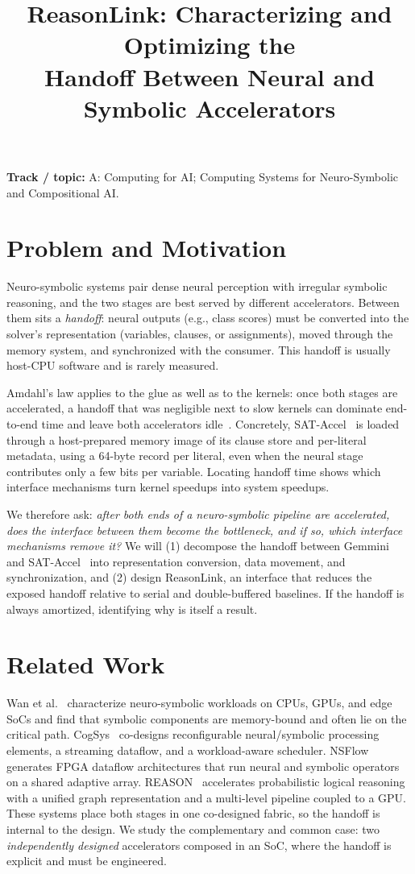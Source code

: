 \documentclass[conference,10pt,letterpaper]{IEEEtran}
\title{ReasonLink: Characterizing and Optimizing the\\Handoff Between Neural and Symbolic Accelerators}
\author{\IEEEauthorblockN{Vayun Gupta (vg2684), Aaron Mano Cherian (amc2535)}
\IEEEauthorblockA{COMS 6998: AI-Native Computing $\mid$ Fall 2026\\
Project Proposal $\mid$ Due October 5, 2026, 11:59 PM ET}}
\begin{document}
\maketitle
\thispagestyle{plain}
\pagestyle{plain}
\noindent\textbf{Track / topic:} A: Computing for AI; Computing Systems for Neuro-Symbolic and Compositional AI.

\section{Problem and Motivation}
Neuro-symbolic systems pair dense neural perception with irregular symbolic reasoning, and the two stages are best served by different accelerators. Between them sits a \emph{handoff}: neural outputs (e.g., class scores) must be converted into the solver's representation (variables, clauses, or assignments), moved through the memory system, and synchronized with the consumer. This handoff is usually host-CPU software and is rarely measured.

Amdahl's law applies to the glue as well as to the kernels: once both stages are accelerated, a handoff that was negligible next to slow kernels can dominate end-to-end time and leave both accelerators idle~\cite{richins2020forest,logca}. Concretely, SAT-Accel~\cite{sataccel} is loaded through a host-prepared memory image of its clause store and per-literal metadata, using a 64-byte record per literal, even when the neural stage contributes only a few bits per variable. Locating handoff time shows which interface mechanisms turn kernel speedups into system speedups.

We therefore ask: \emph{after both ends of a neuro-symbolic pipeline are accelerated, does the interface between them become the bottleneck, and if so, which interface mechanisms remove it?} We will (1) decompose the handoff between Gemmini~\cite{gemmini} and SAT-Accel~\cite{sataccel} into representation conversion, data movement, and synchronization, and (2) design ReasonLink, an interface that reduces the exposed handoff relative to serial and double-buffered baselines. If the handoff is always amortized, identifying why is itself a result.

\section{Related Work}
Wan et al.~\cite{wan2024characterization} characterize neuro-symbolic workloads on CPUs, GPUs, and edge SoCs and find that symbolic components are memory-bound and often lie on the critical path. CogSys~\cite{cogsys} co-designs reconfigurable neural/symbolic processing elements, a streaming dataflow, and a workload-aware scheduler. NSFlow~\cite{nsflow} generates FPGA dataflow architectures that run neural and symbolic operators on a shared adaptive array. REASON~\cite{reason} accelerates probabilistic logical reasoning with a unified graph representation and a multi-level pipeline coupled to a GPU. These systems place both stages in one co-designed fabric, so the handoff is internal to the design. We study the complementary and common case: two \emph{independently designed} accelerators composed in an SoC, where the handoff is explicit and must be engineered.
\end{document}
